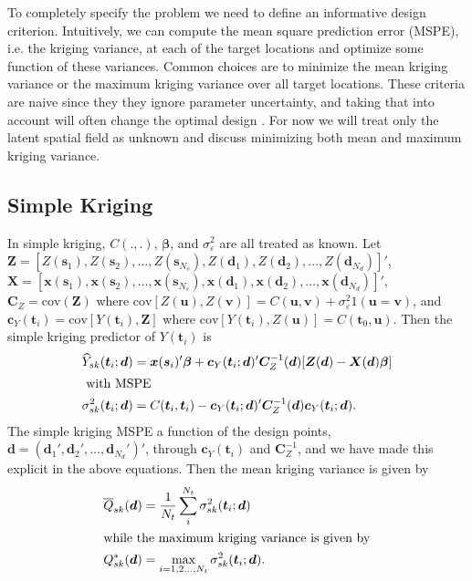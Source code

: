 \documentclass[12pt]{article}
\newcommand{\cov}{\mathrm{cov}}
\begin{document}
To completely specify the problem we need to define an informative design criterion. Intuitively, we can compute the mean square prediction error (MSPE), i.e. the kriging variance, at each of the target locations and optimize some function of these variances. Common choices are to minimize the mean kriging variance or the maximum kriging variance over all target locations. These criteria are naive since they they ignore parameter uncertainty, and taking that into account will often change the optimal design \citep{zimmerman2006optimal}. For now we will treat only the latent spatial field as unknown and discuss minimizing both mean and maximum kriging variance.

\subsection{Simple Kriging}
In simple kriging, $C(.,.)$, $\bm{\beta}$, and $\sigma^2_{\varepsilon}$ are all treated as known. Let $\bm{Z} = [Z(\bm{s}_1), Z(\bm{s}_2), \dots, Z(\bm{s}_{N_s}), Z(\bm{d}_1), Z(\bm{d}_2), \dots, Z(\bm{d}_{N_d}) ]'$, $\bm{X} = [\bm{x}(\bm{s}_1), \bm{x}(\bm{s}_2), \dots, \bm{x}(\bm{s}_{N_s}), \bm{x}(\bm{d}_1), \bm{x}(\bm{d}_2), \dots, \bm{x}(\bm{d}_{N_d})]'$, $\bm{C}_Z = \cov(\bm{Z})$ where $\cov[Z(\bm{u}), Z(\bm{v})] = C(\bm{u},\bm{v}) + \sigma^2_\varepsilon 1(\bm{u} = \bm{v})$, and $\bm{c}_Y(\bm{t}_i) = \cov[Y(\bm{t}_i), \bm{Z}]$ where $\cov[Y(\bm{t}_i), Z(\bm{u})] = C(\bm{t}_0, \bm{u})$. Then the simple kriging predictor of $Y(\bm{t}_i)$ is \citep[Section~4.1.2]{cressie2015statistics}
\begin{align*}
\widehat{Y}_{sk}(\bm{t}_i;\bm{d}) &= \bm{x}(\bm{s}_i)'\bm{\beta} + \bm{c}_Y(\bm{t}_i;\bm{d})'\bm{C}_Z^{-1}(\bm{d})[\bm{Z}(\bm{d}) - \bm{X}(\bm{d})\bm{\beta}]\\
\intertext{ with MSPE }
\sigma_{sk}^{2}(\bm{t}_i;\bm{d}) &= C(\bm{t}_i,\bm{t}_i) - \bm{c}_Y(\bm{t}_i;\bm{d})'\bm{C}_Z^{-1}(\bm{d})\bm{c}_Y(\bm{t}_i;\bm{d}).
\end{align*}
The simple kriging MSPE a function of the design points, $\bm{d}=(\bm{d}_1',\bm{d}_2',\dots,\bm{d}_{N_d}')'$, through $\bm{c}_Y(\bm{t}_i)$ and $\bm{C}_Z^{-1}$, and we have made this explicit in the above equations. Then the mean kriging variance is given by
\begin{align*}
\overline{Q}_{sk}(\bm{d}) &= \frac{1}{N_t}\sum_{i}^{N_t}\sigma^2_{sk}(\bm{t}_i;\bm{d})\\
\intertext{while the maximum kriging variance is given by}
Q_{sk}^*(\bm{d}) &= \max_{i=1,2\dots,N_t}\sigma^2_{sk}(\bm{t}_i;\bm{d}).
\end{align*}
\end{document}
